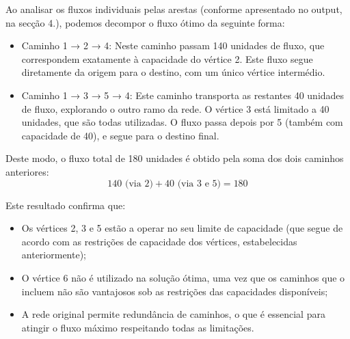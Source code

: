 \documentclass[a4paper,12pt]{article}
\begin{document}
\vspace{0.5em}

Ao analisar os fluxos individuais pelas arestas (conforme apresentado no output, na secção 4.), podemos decompor o fluxo ótimo da seguinte forma:
\begin{itemize}
    \item Caminho 1 → 2 → 4: Neste caminho passam 140 unidades de fluxo, que correspondem exatamente à capacidade do vértice 2. Este fluxo segue diretamente da origem para o destino, com um único vértice intermédio.
    
    \item Caminho 1 → 3 → 5 → 4: Este caminho transporta as restantes 40 unidades de fluxo, explorando o outro ramo da rede. O vértice 3 está limitado a 40 unidades, que são todas utilizadas. O fluxo passa depois por 5 (também com capacidade de 40), e segue para o destino final.
\end{itemize}

Deste modo, o fluxo total de 180 unidades é obtido pela soma dos dois caminhos anteriores:
\[
140 \text{ (via 2)} + 40 \text{ (via 3 e 5)} = 180
\]

Este resultado confirma que:
\begin{itemize}
    \item Os vértices 2, 3 e 5 estão a operar no seu limite de capacidade (que segue de acordo com as restrições de capacidade dos vértices, estabelecidas anteriormente);
    \item O vértice 6 não é utilizado na solução ótima, uma vez que os caminhos que o incluem não são vantajosos sob as restrições das capacidades disponíveis;
    \item A rede original permite redundância de caminhos, o que é essencial para atingir o fluxo máximo respeitando todas as limitações.
\end{itemize}
\end{document}
